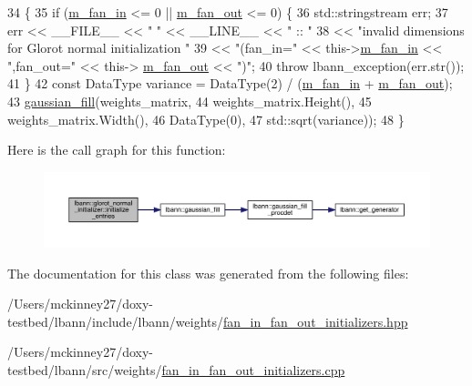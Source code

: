 \begin{DoxyCode}
34                                                                                    \{
35   \textcolor{keywordflow}{if} (\hyperlink{classlbann_1_1fan__in__fan__out__initializer_aea6639db271d9050f0a2e4f8c8dfa6cd}{m\_fan\_in} <= 0 || \hyperlink{classlbann_1_1fan__in__fan__out__initializer_ac67d275ab8574780525d2af59b738338}{m\_fan\_out} <= 0) \{
36     std::stringstream err;
37     err << \_\_FILE\_\_ << \textcolor{stringliteral}{" "} << \_\_LINE\_\_ << \textcolor{stringliteral}{" :: "}
38         << \textcolor{stringliteral}{"invalid dimensions for Glorot normal initialization "}
39         << \textcolor{stringliteral}{"(fan\_in="} << this->\hyperlink{classlbann_1_1fan__in__fan__out__initializer_aea6639db271d9050f0a2e4f8c8dfa6cd}{m\_fan\_in} << \textcolor{stringliteral}{",fan\_out="} << this->
      \hyperlink{classlbann_1_1fan__in__fan__out__initializer_ac67d275ab8574780525d2af59b738338}{m\_fan\_out} << \textcolor{stringliteral}{")"};
40     \textcolor{keywordflow}{throw} lbann\_exception(err.str());
41   \}
42   \textcolor{keyword}{const} DataType variance = DataType(2) / (\hyperlink{classlbann_1_1fan__in__fan__out__initializer_aea6639db271d9050f0a2e4f8c8dfa6cd}{m\_fan\_in} + \hyperlink{classlbann_1_1fan__in__fan__out__initializer_ac67d275ab8574780525d2af59b738338}{m\_fan\_out});
43   \hyperlink{namespacelbann_abd116f95f55d0e29d9a0cc386139c4b4}{gaussian\_fill}(weights\_matrix,
44                 weights\_matrix.Height(),
45                 weights\_matrix.Width(),
46                 DataType(0),
47                 std::sqrt(variance));
48 \}
\end{DoxyCode}
Here is the call graph for this function\+:\nopagebreak
\begin{figure}[H]
\begin{center}
\leavevmode
\includegraphics[width=350pt]{classlbann_1_1glorot__normal__initializer_a0bd7253159fe5ca9039af44b7fca1709_cgraph}
\end{center}
\end{figure}


The documentation for this class was generated from the following files\+:\begin{DoxyCompactItemize}
\item 
/\+Users/mckinney27/doxy-\/testbed/lbann/include/lbann/weights/\hyperlink{fan__in__fan__out__initializers_8hpp}{fan\+\_\+in\+\_\+fan\+\_\+out\+\_\+initializers.\+hpp}\item 
/\+Users/mckinney27/doxy-\/testbed/lbann/src/weights/\hyperlink{fan__in__fan__out__initializers_8cpp}{fan\+\_\+in\+\_\+fan\+\_\+out\+\_\+initializers.\+cpp}\end{DoxyCompactItemize}
